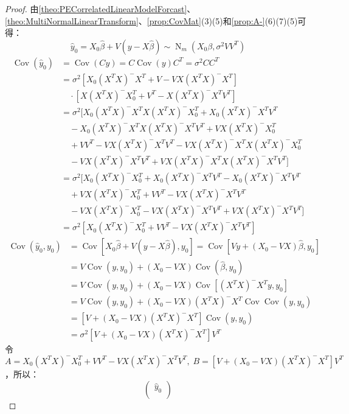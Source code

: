 \begin{proof}
	由\cref{theo:PECorrelatedLinearModelForcast}、\cref{theo:MultiNormalLinearTransform}、\cref{prop:CovMat}(3)(5)和\cref{prop:A-}(6)(7)(5)可得：
	\begin{equation*}
		\hat{y}_0=X_0\hat{\beta}+V(y-X\hat{\beta})\sim\operatorname{N}_m(X_0\beta,\sigma^2VV^T)
	\end{equation*}
	\begin{align*}
		\operatorname{Cov}(\hat{y}_0)&=\operatorname{Cov}(Cy)=C\operatorname{Cov}(y)C^T=\sigma^2CC^T \\
		&=\sigma^2[X_0(X^TX)^-X^T+V-VX(X^TX)^-X^T] \\
		&\quad\cdot[X(X^TX)^-X_0^T+V^T-X(X^TX)^-X^TV^T] \\
		&=\sigma^2[X_0(X^TX)^-X^TX(X^TX)^-X_0^T+X_0(X^TX)^-X^TV^T \\
		&\quad-X_0(X^TX)^-X^TX(X^TX)^-X^TV^T+VX(X^TX)^-X_0^T \\
		&\quad+VV^T-VX(X^TX)^-X^TV^T-VX(X^TX)^-X^TX(X^TX)^-X_0^T \\
		&\quad-VX(X^TX)^-X^TV^T+VX(X^TX)^-X^TX(X^TX)^-X^TV^T] \\
		&=\sigma^2[X_0(X^TX)^-X_0^T+X_0(X^TX)^-X^TV^T-X_0(X^TX)^-X^TV^T \\
		&\quad+VX(X^TX)^-X_0^T+VV^T-VX(X^TX)^-X^TV^T \\
		&\quad-VX(X^TX)^-X_0^T-VX(X^TX)^-X^TV^T+VX(X^TX)^-X^TV^T] \\
		&=\sigma^2[X_0(X^TX)^-X_0^T+VV^T-VX(X^TX)^-X^TV^T]
	\end{align*}
	\begin{align*}
		\operatorname{Cov}(\hat{y}_0,y_0)
		&=\operatorname{Cov}[X_0\hat{\beta}+V(y-X\hat{\beta}),y_0]=\operatorname{Cov}[Vy+(X_0-VX)\hat{\beta},y_0] \\
		&=V\operatorname{Cov}(y,y_0)+(X_0-VX)\operatorname{Cov}(\hat{\beta},y_0) \\
		&=V\operatorname{Cov}(y,y_0)+(X_0-VX)\operatorname{Cov}[(X^TX)^-X^Ty,y_0] \\
		&=V\operatorname{Cov}(y,y_0)+(X_0-VX)(X^TX)^-X^T\operatorname{Cov}\operatorname{Cov}(y,y_0) \\
		&=[V+(X_0-VX)(X^TX)^-X^T]\operatorname{Cov}(y,y_0) \\
		&=\sigma^2[V+(X_0-VX)(X^TX)^-X^T]V^T
	\end{align*}
	令$A=X_0(X^TX)^-X_0^T+VV^T-VX(X^TX)^-X^TV^T,\;B=[V+(X_0-VX)(X^TX)^-X^T]V^T$，所以：
	\begin{equation*}
		\begin{pmatrix}
			\hat{y}_0 \\

\end{pmatrix}
\end{equation*}
\end{proof}
